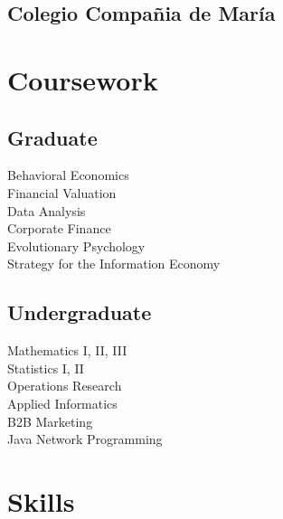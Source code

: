 \documentclass[letterpaper]{deedy-resume} %
\begin{document}
\begin{minipage}[t]{0.33\textwidth}
\subsection{Colegio Compañia de María}




\section{Coursework}

\subsection{Graduate}

Behavioral Economics \\
Financial Valuation \\
Data Analysis \\
Corporate Finance \\
Evolutionary Psychology \\
Strategy for the Information Economy \\

\sectionspace %


\subsection{Undergraduate}

Mathematics I, II, III \\
Statistics I, II \\
Operations Research \\
Applied Informatics \\
B2B Marketing \\
Java Network Programming \\



\section{Skills}


\end{minipage}
\end{document}
